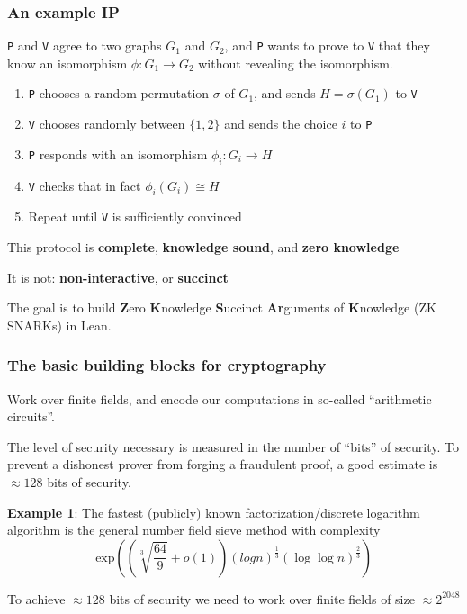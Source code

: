 \documentclass[options]{beamer}
\begin{document}
\begin{frame}[fragile]
    \frametitle{An example IP}

    \verb+P+ and \verb+V+ agree to two graphs $G_1$ and $G_2$, and \verb+P+ wants to prove to \verb+V+ that they know an isomorphism $\phi : G_1 \to G_2$ without revealing the isomorphism.

    \pause

    \begin{enumerate}
        \item \verb+P+ chooses a random permutation $\sigma$ of $G_1$, and sends $H = \sigma(G_1)$ to  \verb+V+
        \item \verb+V+ chooses randomly between $\{1, 2\}$ and sends the choice $i$ to \verb+P+
        \item \verb+P+ responds with an isomorphism $\phi_i : G_i \to H$
        \item \verb+V+ checks that in fact $\phi_i(G_i) \cong H$
        \item Repeat until \verb+V+ is sufficiently convinced
    \end{enumerate}

    \pause 
    This protocol is {\bf complete}, {\bf knowledge sound}, and {\bf zero knowledge}

    \vspace{5pt}
    \pause

    It is not: {\bf non-interactive}, or {\bf succinct}

    The goal is to build {\bf Z}ero {\bf K}nowledge {\bf S}uccinct {\bf Ar}guments of {\bf K}nowledge (ZK SNARKs) in Lean.
\end{frame}

\begin{frame}
    \frametitle{The basic building blocks for cryptography}


    Work over finite fields, and encode our computations in so-called ``arithmetic circuits''.

    The level of security necessary is measured in the number of ``bits'' of security. To prevent a dishonest prover from forging a fraudulent proof, a good estimate is $\approx 128$ bits of security.
    
    \vspace{6pt}
    \pause

    {\bf Example 1}: The fastest (publicly) known factorization/discrete logarithm algorithm is the general number field sieve method with complexity
    $$\mathrm{exp}\left(\left(\sqrt[3]{\frac{64}{9}} + o(1)\right)(log n)^{\frac{1}{3}} (\log \log n)^{\frac{2}{3}}\right)$$

    To achieve $\approx 128$ bits of security we need to work over finite fields of size $\approx 2^{2048}$
\end{frame}
\end{document}
